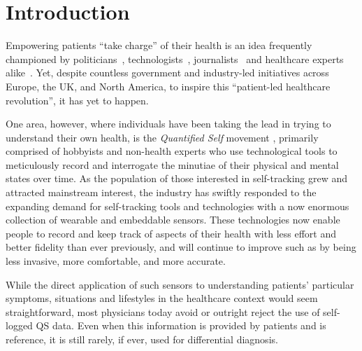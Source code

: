 \documentclass{sigchi}
\begin{document}

 

\section{Introduction}

Empowering patients ``take charge'' of their health is an idea frequently championed by politicians~\cite{brown, obama}, technologists~\cite{ihealth}, journalists~\cite{goetz} and healthcare experts alike~\cite{swan2012health}.  Yet, despite countless government and industry-led initiatives across Europe, the UK, and North America, to inspire this ``patient-led healthcare revolution'', it has yet to happen.  

One area, however, where individuals have been taking the lead in trying to understand their own health, is the \emph{Quantified Self} movement \cite{}, primarily comprised of hobbyists and non-health experts who use technological tools to meticulously record and interrogate the minutiae of their physical and mental states over time.   As the population of those interested in self-tracking grew and attracted mainstream interest, the industry has swiftly responded to the expanding demand for self-tracking tools and technologies with a now enormous collection of wearable and embeddable sensors.  These technologies now enable people to record and keep track of aspects of their health with less effort and better fidelity than ever previously, and will continue to improve such as by being less invasive, more comfortable, and more accurate.

While the direct application of such sensors to understanding patients' particular symptoms, situations and lifestyles in the healthcare context would seem straightforward, most physicians today avoid or outright reject the use of self-logged QS data. Even when this information is provided by patients and is reference, it is still rarely, if ever, used for differential diagnosis.  
\end{document}
